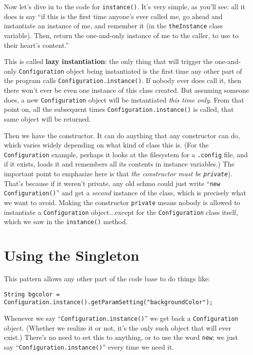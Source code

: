 Now let's dive in to the code for \texttt{instance()}. It's very simple, as
you'll see: all it does is say ``if this is the first time anyone's ever
called me, go ahead and instantiate an instance of me, and remember it (in the
\texttt{theInstance} class variable). Then, return the one-and-only instance
of me to the caller, to use to their heart's content.''

This is called \textbf{lazy instantiation}: the only thing that will trigger
the one-and-only \texttt{Configuration} object being instantiated is the first
time any other part of the program calls \texttt{Configuration.instance()}. If
nobody ever does call it, then there won't ever be even one instance of this
class created. But assuming someone does, a new \texttt{Configuration} object
will be instantiated \textit{this time only}. From that point on, all the
subsequent times \texttt{Configuration.instance()} is called, that same object
will be returned.

Then we have the constructor. It can do anything that any constructor can do,
which varies widely depending on what kind of class this is. (For the
\texttt{Configuration} example, perhaps it looks at the filesystem for a
\texttt{.config} file, and if it exists, loads it and remembers all its
contents in instance variables.) The important point to emphasize here is that
\textit{the constructor must be \texttt{private}}). That's because if it
weren't private, any old schmo could just write ``\texttt{new
Configuration()}'' and get a \textit{second} instance of the class, which is
precisely what we want to avoid. Making the constructor \texttt{private} means
nobody is allowed to instantiate a \texttt{Configuration} object...except for
the \texttt{Configuration} class itself, which we saw in the
\texttt{instance()} method.


\section{Using the Singleton}

This pattern allows any other part of the code base to do things like:

\begin{Verbatim}[fontsize=\footnotesize,samepage=true,frame=single]
  String bgcolor = Configuration.instance().getParamSetting("backgroundColor");
\end{Verbatim}

Whenever we say ``\texttt{Configuration.instance()}'' we get back a
\texttt{Configuration} object. (Whether we realize it or not, it's the only
such object that will ever exist.) There's no need to set this to anything, or
to use the word \texttt{new}; we just say ``\texttt{Configuration.instance()}''
every time we need it.

